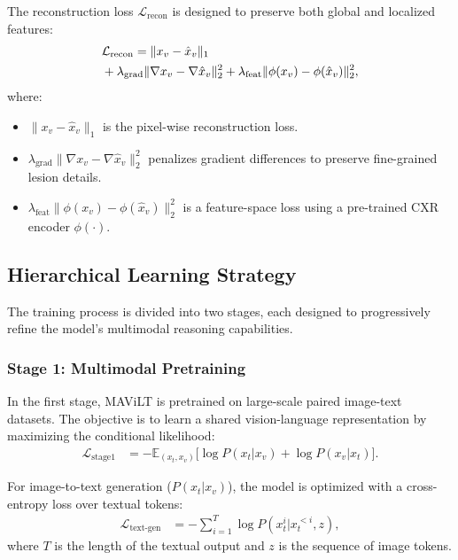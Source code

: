 The reconstruction loss \(\mathcal{L}_{\text{recon}}\) is designed to preserve both global and localized features:
\begin{align}
    &\mathcal{L}_{\text{recon}} = \| x_v - \hat{x}_v \|_1 \notag\\
    &+ \lambda_{\text{grad}} \| \nabla x_v - \nabla \hat{x}_v \|_2^2 + \lambda_{\text{feat}} \| \phi(x_v) - \phi(\hat{x}_v) \|_2^2,
\end{align}
where:
\begin{itemize}
    \item \( \| x_v - \hat{x}_v \|_1 \) is the pixel-wise reconstruction loss.
    \item \( \lambda_{\text{grad}} \| \nabla x_v - \nabla \hat{x}_v \|_2^2 \) penalizes gradient differences to preserve fine-grained lesion details.
    \item \( \lambda_{\text{feat}} \| \phi(x_v) - \phi(\hat{x}_v) \|_2^2 \) is a feature-space loss using a pre-trained CXR encoder \( \phi(\cdot) \).
\end{itemize}

\subsection{Hierarchical Learning Strategy}

The training process is divided into two stages, each designed to progressively refine the model's multimodal reasoning capabilities.

\subsubsection{Stage 1: Multimodal Pretraining}

In the first stage, MAViLT is pretrained on large-scale paired image-text datasets. The objective is to learn a shared vision-language representation by maximizing the conditional likelihood:
\begin{align}
    \mathcal{L}_{\text{stage1}} &= - \mathbb{E}_{(x_t, x_v)} \big[ \log P(x_t | x_v) + \log P(x_v | x_t) \big].
\end{align}

For image-to-text generation (\(P(x_t | x_v)\)), the model is optimized with a cross-entropy loss over textual tokens:
\begin{align}
    \mathcal{L}_{\text{text-gen}} &= - \sum_{i=1}^{T} \log P(x_t^i | x_t^{<i}, z),
\end{align}
where \( T \) is the length of the textual output and \( z \) is the sequence of image tokens.

